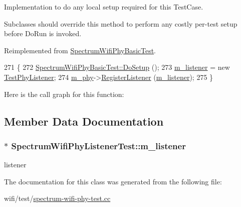 Implementation to do any local setup required for this Test\+Case. 

Subclasses should override this method to perform any costly per-\/test setup before Do\+Run is invoked. 

Reimplemented from \hyperlink{classSpectrumWifiPhyBasicTest_a34f2cbd2cf4e0fb06ef96efe8afc8bdd}{Spectrum\+Wifi\+Phy\+Basic\+Test}.


\begin{DoxyCode}
271 \{
272   \hyperlink{classSpectrumWifiPhyBasicTest_a34f2cbd2cf4e0fb06ef96efe8afc8bdd}{SpectrumWifiPhyBasicTest::DoSetup} ();
273   \hyperlink{classSpectrumWifiPhyListenerTest_a648872ae7d21db921a27d2520991fee0}{m\_listener} = \textcolor{keyword}{new} \hyperlink{classTestPhyListener}{TestPhyListener};
274   \hyperlink{classSpectrumWifiPhyBasicTest_aea1ad31a982e7321017675c050488bd6}{m\_phy}->\hyperlink{classns3_1_1WifiPhy_accee79baeb6d9dbf80cf5711d81fc035}{RegisterListener} (\hyperlink{classSpectrumWifiPhyListenerTest_a648872ae7d21db921a27d2520991fee0}{m\_listener});
275 \}
\end{DoxyCode}


Here is the call graph for this function\+:




\subsection{Member Data Documentation}
\subsubsection[{\texorpdfstring{m\+\_\+listener}{m_listener}}]{$\ast$ Spectrum\+Wifi\+Phy\+Listener\+Test\+::m\+\_\+listener\hspace{0.3cm}{\ttfamily [private]}}\hypertarget{classSpectrumWifiPhyListenerTest_a648872ae7d21db921a27d2520991fee0}{}\label{classSpectrumWifiPhyListenerTest_a648872ae7d21db921a27d2520991fee0}


listener 



The documentation for this class was generated from the following file\+:\begin{DoxyCompactItemize}
\item 
wifi/test/\hyperlink{spectrum-wifi-phy-test_8cc}{spectrum-\/wifi-\/phy-\/test.\+cc}\end{DoxyCompactItemize}

